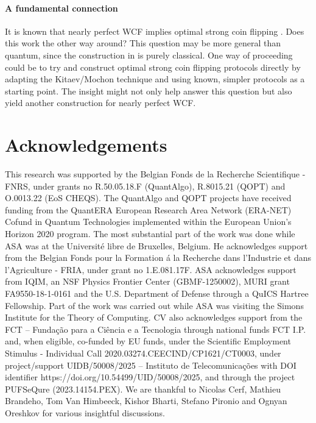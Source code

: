 \documentclass{article}
\begin{document}
\paragraph{A fundamental connection} It is known that nearly perfect
WCF implies optimal strong coin flipping \cite{CK09}. Does this work the other way around?
This question may be more general than quantum, since the construction
in \cite{CK09} is purely classical. One way of proceeding could be
to try and construct optimal strong coin flipping protocols directly by adapting the Kitaev/Mochon
technique and using known, simpler protocols as a starting point.
The insight might not only help answer this question but also
yield another construction for nearly perfect WCF.











\section*{Acknowledgements}
This research was supported by the Belgian
Fonds de la Recherche Scientifique - FNRS, under grants
no R.50.05.18.F (QuantAlgo), R.8015.21 (QOPT) and O.0013.22 (EoS CHEQS). The QuantAlgo and QOPT projects have received funding from the QuantERA European Research Area Network (ERA-NET) Cofund in Quantum Technologies implemented within the European Union's Horizon 2020 program.
The most substantial part of the work was done while ASA was at the Universit{\' e} libre de Bruxelles, Belgium. He acknowledges support from the Belgian Fonds pour la Formation {\' a} la Recherche dans l'Industrie et dans l'Agriculture - FRIA, under grant no 1.E.081.17F. ASA acknowledges support from IQIM, an NSF Physics Frontier Center (GBMF-1250002), MURI grant FA9550-18-1-0161 and the U.S. Department of Defense through a QuICS Hartree Fellowship. Part of the work was carried out while ASA was visiting the Simons Institute for the Theory of Computing.
%
CV also acknowledges support from the FCT -- Funda\c c\~ao para a Ci\^encia e a Tecnologia through national funds FCT I.P. and, when eligible, co-funded by EU funds, under the
Scientific Employment Stimulus - Individual Call 2020.03274.CEECIND/CP1621/CT0003, under
project/support UIDB/50008/2025 -- Instituto de Telecomunicações with DOI identifier https://doi.org/10.54499/UID/50008/2025, and through the project PUFSeQure (2023.14154.PEX).
We are thankful to Nicolas Cerf, Mathieu Brandeho, Tom Van Himbeeck, Kishor Bharti, Stefano Pironio and Ognyan Oreshkov for various insightful discussions.
\end{document}
